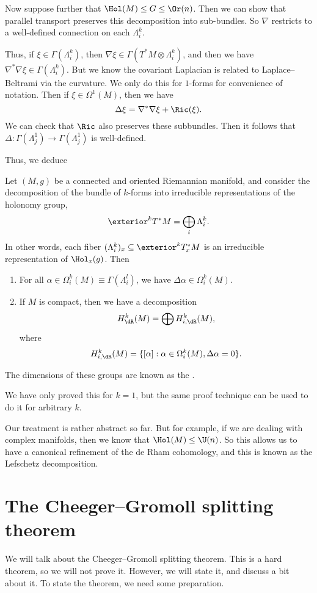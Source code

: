 \documentclass[a4paper]{article}
\begin{document}
Now suppose further that $\Hol(M) \leq G \leq \Or(n)$. Then we can show that parallel transport preserves this decomposition into sub-bundles. So $\nabla$ restricts to a well-defined connection on each $\Lambda^k_i$.

Thus, if $\xi \in \Gamma(\Lambda_i^k)$, then $\nabla \xi \in \Gamma(T^* M \otimes \Lambda^k_i)$, and then we have $\nabla^*\nabla \xi \in \Gamma(\Lambda_i^k)$. But we know the covariant Laplacian is related to Laplace--Beltrami via the curvature. We only do this for $1$-forms for convenience of notation. Then if $\xi \in \Omega^1(M)$, then we have
\[
  \Delta \xi = \nabla^* \nabla \xi + \Ric(\xi).
\]
We can check that $\Ric$ also preserves these subbundles. Then it follows that $\Delta: \Gamma(\Lambda_j^1) \to \Gamma(\Lambda^1_j)$ is well-defined.

Thus, we deduce
\begin{thm}
  Let $(M, g)$ be a connected and oriented Riemannian manifold, and consider the decomposition of the bundle of $k$-forms into irreducible representations of the holonomy group,
  \[
    \exterior^k T^* M = \bigoplus_i \Lambda_i^k.
  \]
  In other words, each fiber $(\Lambda_i^k)_x \subseteq \exterior^k T^*_x M$ is an irreducible representation of $\Hol_x(g)$. Then
  \begin{enumerate}
    \item For all $\alpha \in \Omega^k_i(M) \equiv \Gamma(\Lambda_i^l)$, we have $\Delta \alpha \in \Omega_i^k(M)$.
    \item If $M$ is compact, then we have a decomposition
      \[
        H_{\dR}^k (M) = \bigoplus H_{i, \dR}^k (M),
      \]
      where
      \[
        H^k_{i, \dR} (M) = \{[\alpha] : \alpha \in \Omega_i^k(M), \Delta \alpha = 0\}.
      \]
  \end{enumerate}
  The dimensions of these groups are known as the .
\end{thm}
We have only proved this for $k = 1$, but the same proof technique can be used to do it for arbitrary $k$.

Our treatment is rather abstract so far. But for example, if we are dealing with complex manifolds, then we know that $\Hol(M) \leq \U(n)$. So this allows us to have a canonical refinement of the de Rham cohomology, and this is known as the Lefschetz decomposition.

\section{The Cheeger--Gromoll splitting theorem}
We will talk about the Cheeger--Gromoll splitting theorem. This is a hard theorem, so we will not prove it. However, we will state it, and discuss a bit about it. To state the theorem, we need some preparation.
\end{document}

